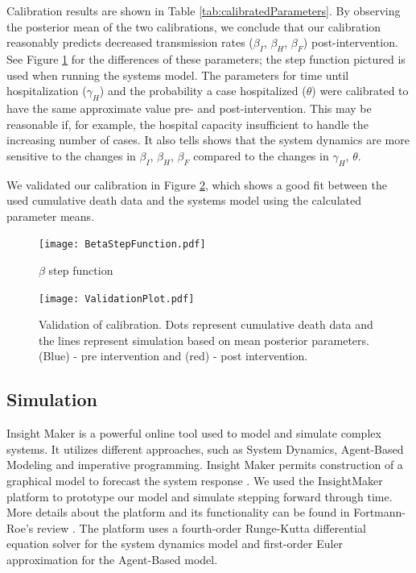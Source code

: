 Calibration results are shown in Table \ref{tab:calibratedParameters}. By observing the posterior mean of the two calibrations, we conclude that our calibration reasonably predicts decreased transmission rates ($\beta_I$, $\beta_H$, $\beta_F$) post-intervention. See Figure \ref{fig:BetaStepFunction} for the differences of these parameters; the step function pictured is used when running the systems model. The parameters for time until hospitalization ($\gamma_H$) and the probability a case hospitalized ($\theta$) were calibrated to have the same approximate value pre- and post-intervention. This may be reasonable if, for example, the hospital capacity  insufficient to handle the increasing number of cases. It also tells shows that the system dynamics are more sensitive to the changes in {$\beta_I$, $\beta_H$, $\beta_F$} compared to the changes in {$\gamma_H$, $\theta$}.


We validated our calibration in Figure \ref{fig:Cumulative _Death}, which shows a good fit between the used cumulative death data and the systems model using the calculated parameter means.


\begin{figure}[!h]
  \centering
  \texttt{[image: BetaStepFunction.pdf]}
  \caption{$\beta$ step function} 
\label{fig:BetaStepFunction} 
\end{figure}


\begin{figure}[h]
  \centering
  \texttt{[image: ValidationPlot.pdf]}
  \caption{Validation of calibration. Dots represent cumulative death data and the lines represent simulation based on mean posterior parameters. (Blue) - pre intervention and (red) - post intervention.}
\label{fig:Cumulative _Death}
\end{figure}




\subsection{Simulation}
 Insight Maker is a powerful online tool used to model and simulate complex systems. It utilizes different approaches, such as System Dynamics, Agent-Based Modeling and imperative programming. Insight Maker permits  construction of a graphical model to forecast the system response \cite{FortmannRoe}. We used the InsightMaker platform to prototype our model and simulate stepping forward through time. More details about the platform and its functionality can be found in Fortmann-Roe's review \cite{FortmannRoe}. The platform uses a fourth-order Runge-Kutta differential equation solver for the system dynamics model and  first-order Euler approximation for the Agent-Based model.\\

